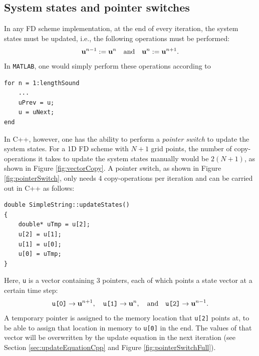 \subsection{System states and pointer switches}\label{sec:pointerSwitch}
In any FD scheme implementation, at the end of every iteration, the system states must be updated, i.e., the following operations must be performed:
\begin{equation*}
    \mathbf{u}^{n-1} := \mathbf{u}^{n} \quad \text{and} \quad \mathbf{u}^{n} := \mathbf{u}^{n+1}.
\end{equation*}
In \texttt{MATLAB}, one would simply perform these operations according to

\setlstMAT
\begin{lstlisting}[belowskip=-0.5\baselineskip]
for n = 1:lengthSound
    ...
    uPrev = u;
    u = uNext;
end
\end{lstlisting}
In C++, however, one has the ability to perform a \textit{pointer switch} to update the system states. For a 1D FD scheme with $N+1$ grid points, the number of copy-operations it takes to update the system states manually would be $2(N+1)$, as shown in Figure \ref{fig:vectorCopy}. A pointer switch, as shown in Figure \ref{fig:pointerSwitch}, only needs 4 copy-operations per iteration and can be carried out in C++ as follows:

\setlstCpp
\begin{lstlisting}[belowskip=-0.5\baselineskip]
double SimpleString::updateStates()
{
    double* uTmp = u[2];
    u[2] = u[1];
    u[1] = u[0];
    u[0] = uTmp;
}
\end{lstlisting}
Here, \texttt{u} is a vector containing 3 pointers, each of which points a state vector at a certain time step: 
\begin{equation*}
    \texttt{u[0]} \rightarrow \mathbf{u}^{n+1}, \quad \texttt{u[1]} \rightarrow \mathbf{u}^{n}, \quad \text{and} \quad \texttt{u[2]} \rightarrow \mathbf{u}^{n-1}.
\end{equation*}
A temporary pointer is assigned to the memory location that \texttt{u[2]} points at, to be able to assign that location in memory to \texttt{u[0]} in the end. The values of that vector will be overwritten by the update equation in the next iteration (see Section \ref{sec:updateEquationCpp} and Figure \ref{fig:pointerSwitchFull}).

